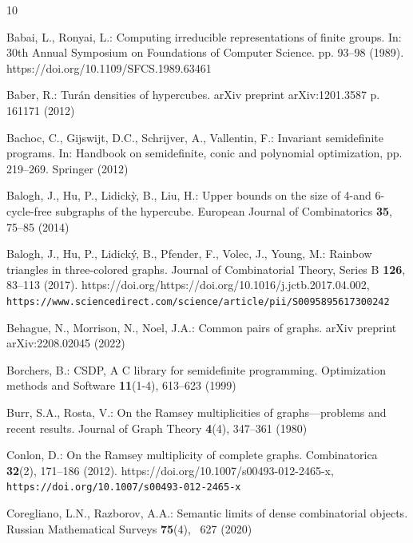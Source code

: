 \documentclass[a4paper,11pt]{article}
\numberwithin{equation}{section}
\begin{document}
\begin{thebibliography}{10}
\providecommand{\url}[1]{\texttt{#1}}
\providecommand{\urlprefix}{URL }
\providecommand{\doi}[1]{https://doi.org/#1}

Babai, L., Ronyai, L.: Computing irreducible representations of finite groups.
  In: 30th Annual Symposium on Foundations of Computer Science. pp. 93--98
  (1989). \doi{10.1109/SFCS.1989.63461}

Baber, R.: Tur{\'a}n densities of hypercubes. arXiv preprint arXiv:1201.3587 p.
  161171 (2012)

Bachoc, C., Gijswijt, D.C., Schrijver, A., Vallentin, F.: Invariant
  semidefinite programs. In: Handbook on semidefinite, conic and polynomial
  optimization, pp. 219--269. Springer (2012)

Balogh, J., Hu, P., Lidick{\`y}, B., Liu, H.: Upper bounds on the size of 4-and
  6-cycle-free subgraphs of the hypercube. European Journal of Combinatorics
  \textbf{35},  75--85 (2014)

Balogh, J., Hu, P., Lidický, B., Pfender, F., Volec, J., Young, M.: Rainbow
  triangles in three-colored graphs. Journal of Combinatorial Theory, Series B
  \textbf{126},  83--113 (2017).
  \doi{https://doi.org/10.1016/j.jctb.2017.04.002},
  \url{https://www.sciencedirect.com/science/article/pii/S0095895617300242}

Behague, N., Morrison, N., Noel, J.A.: Common pairs of graphs. arXiv preprint
  arXiv:2208.02045  (2022)

Borchers, B.: {CSDP}, {A C} library for semidefinite programming. Optimization
  methods and Software  \textbf{11}(1-4),  613--623 (1999)

Burr, S.A., Rosta, V.: On the {R}amsey multiplicities of graphs—problems and
  recent results. Journal of Graph Theory  \textbf{4}(4),  347--361 (1980)

Conlon, D.: On the {R}amsey multiplicity of complete graphs. Combinatorica
  \textbf{32}(2),  171--186 (2012). \doi{10.1007/s00493-012-2465-x},
  \url{https://doi.org/10.1007/s00493-012-2465-x}

Coregliano, L.N., Razborov, A.A.: Semantic limits of dense combinatorial
  objects. Russian Mathematical Surveys  \textbf{75}(4), ~627 (2020)


\end{thebibliography}
\end{document}
